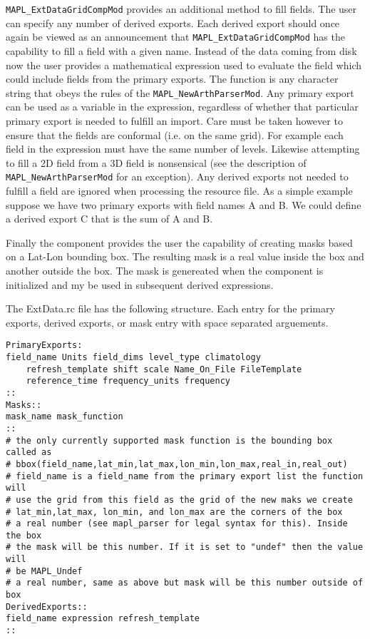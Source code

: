 {\tt MAPL\_ExtDataGridCompMod} provides an additional method to fill fields. The user can specify
any number of derived exports. Each derived export should once again be viewed as an announcement that
{\tt MAPL\_ExtDataGridCompMod} has the capability to fill a field with a given name.
Instead of the data coming from disk now the user provides a mathematical expression used to evaluate the field
which could include fields from the primary exports.
The function is any character string that obeys
the rules of the {\tt MAPL\_NewArthParserMod}. Any primary export can be used as a variable in the expression,
regardless of whether
that particular primary export is needed to fulfill an import. Care must be taken however
to ensure that the fields are conformal (i.e. on the same grid). For example each field in the expression must have the
same number of levels. Likewise attempting to fill a 2D field from a 3D field is nonsensical
(see the description of {\tt MAPL\_NewArthParserMod} for an exception). 
Any derived exports not needed to fulfill a field are ignored when processing the resource file.
As a simple example suppose we have two primary exports with field names A and B. We could
define a derived export C that is the sum of A and B.

Finally the component provides the user the capability of creating masks based on a Lat-Lon bounding box.
The resulting mask is a real value inside the box and another outside the box. The mask is genereated
when the component is initialized and my be used in subsequent derived expressions.

The ExtData.rc file has the following structure. Each entry for the primary exports, derived exports, or mask entry with space separated arguements.
\begin{verbatim}
PrimaryExports:
field_name Units field_dims level_type climatology 
    refresh_template shift scale Name_On_File FileTemplate
    reference_time frequency_units frequency
::
Masks::
mask_name mask_function
::
# the only currently supported mask function is the bounding box called as
# bbox(field_name,lat_min,lat_max,lon_min,lon_max,real_in,real_out)
# field_name is a field_name from the primary export list the function will
# use the grid from this field as the grid of the new maks we create
# lat_min,lat_max, lon_min, and lon_max are the corners of the box
# a real number (see mapl_parser for legal syntax for this). Inside the box
# the mask will be this number. If it is set to "undef" then the value will
# be MAPL_Undef
# a real number, same as above but mask will be this number outside of box
DerivedExports::
field_name expression refresh_template
::
\end{verbatim}

